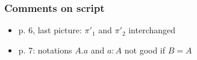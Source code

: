 \documentclass[handout]{beamer}
\begin{document}
\frame
  {   
    \frametitle{Comments on script}\label{Ch1:comments}

 \begin{itemize}[<+->]
\item p. 6, last picture: $\pi'_1$ and  $\pi'_2$ interchanged
\item p. 7: notations $A.a$ and $a:A$ not good if $B=A$
 \end{itemize}

 }
\end{document}
